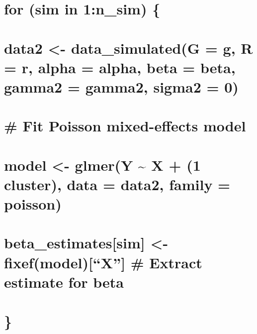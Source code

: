 \documentclass[
]{article}
\begin{document}
\hypertarget{section-14}{%
\section{}\label{section-14}}

\hypertarget{for-sim-in-1n_sim}{%
\section{for (sim in 1:n\_sim) \{}\label{for-sim-in-1n_sim}}

\hypertarget{data2---data_simulatedg-g-r-r-alpha-alpha-beta-beta-gamma2-gamma2-sigma2-0}{%
\section{data2 \textless- data\_simulated(G = g, R = r, alpha = alpha,
beta = beta, gamma2 = gamma2, sigma2 =
0)}\label{data2---data_simulatedg-g-r-r-alpha-alpha-beta-beta-gamma2-gamma2-sigma2-0}}

\hypertarget{section-15}{%
\section{}\label{section-15}}

\hypertarget{fit-poisson-mixed-effects-model}{%
\section{\# Fit Poisson mixed-effects
model}\label{fit-poisson-mixed-effects-model}}

\hypertarget{model---glmery-x-1-cluster-data-data2-family-poisson}{%
\section{model \textless- glmer(Y \textasciitilde{} X + (1 \textbar{}
cluster), data = data2, family =
poisson)}\label{model---glmery-x-1-cluster-data-data2-family-poisson}}

\hypertarget{beta_estimatessim---fixefmodelx-extract-estimate-for-beta}{%
\section{beta\_estimates{[}sim{]} \textless- fixef(model){[}``X''{]} \#
Extract estimate for
beta}\label{beta_estimatessim---fixefmodelx-extract-estimate-for-beta}}

\hypertarget{section-16}{%
\section{\}}\label{section-16}}
\end{document}

